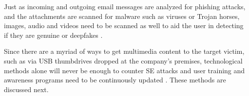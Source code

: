 Just as incoming and outgoing email messages are analyzed for phishing attacks, and the attachments are scanned for malware such as viruses or Trojan horses, images, audio and videos need to be scanned as well to aid the user in detecting if they are genuine or deepfakes \citep{mirskyTheCreationAndDetectionOfDeepfakes2021}.

Since there are a myriad of ways to get multimedia content to the target victim, such as via USB thumbdrives dropped at the company's premises, technological methods alone will never be enough to counter SE attacks and user training and awareness programs need to be continuously updated \citep{hadnagySocialEngineering2018}. These methods are discussed next.

\begin{comment}
\subsubsection{AI-assisted phishing detection}

Modern phishing attacks leverage advanced AI techniques to create highly convincing fake websites and emails that mimic legitimate entities, making it increasingly difficult for users to distinguish betweeen authentic and malicious content. To counter these sophisticated phishing attacks, researches have developed various AI-enabled detection techniques, including Machine Learning (ML), Deep Learning (DL), Hybrid Learning and Scenario-based approaches \citep{basitComprehensiveSurveyAIenabledPhishingAttacks2021}. These methods have shown great promise in identifying phishing attempts with high accuracy, often surpassing traditional detection methods.

For instance, classification techniques such as Random Forest (RF), Support Vector Machines (SVM) and k-Nearest Neighbor (k-NN) have demonstrated over 95 \% accuracy in detecting phishing attacks. However, these methods also come with challenges, such as high computational costs and the need for large datasets.

Machine learning, for instance, combats phishing by analyzing massive amounts of data to identify patterns and features typical of phishing attempts. By training models on datasets containing both legitimate and phishing emails or websites, ML algorithms can learn to distinguish between the two with some methods, such as Random Forest (RF), Support Vector Machines (SVM) and k-Nearest Neighor (k-NN) demonstrating over 95 \% accuracy compared to traditional, non-AI based methods. However, care has to be taken when choosing the datasets.


\end{comment}
